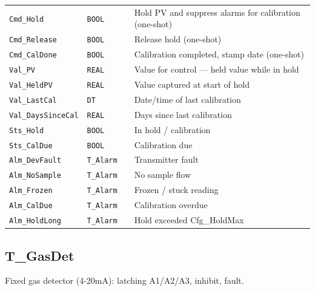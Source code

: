 \begin{small}
\begin{longtable}{@{}P{3.70cm}P{2.20cm}P{1.70cm}P{8.91cm}@{}}
\texttt{Cmd\_Hold} & \texttt{BOOL} &  & Hold PV and suppress alarms for calibration (one-shot) \\
\texttt{Cmd\_Release} & \texttt{BOOL} &  & Release hold (one-shot) \\
\texttt{Cmd\_CalDone} & \texttt{BOOL} &  & Calibration completed, stamp date (one-shot) \\
\texttt{Val\_PV} & \texttt{REAL} &  & Value for control --- held value while in hold \\
\texttt{Val\_HeldPV} & \texttt{REAL} &  & Value captured at start of hold \\
\texttt{Val\_LastCal} & \texttt{DT} &  & Date/\allowbreak{}time of last calibration \\
\texttt{Val\_DaysSinceCal} & \texttt{REAL} &  & Days since last calibration \\
\texttt{Sts\_Hold} & \texttt{BOOL} &  & In hold /\allowbreak{} calibration \\
\texttt{Sts\_CalDue} & \texttt{BOOL} &  & Calibration due \\
\texttt{Alm\_DevFault} & \texttt{T\_Alarm} &  & Transmitter fault \\
\texttt{Alm\_NoSample} & \texttt{T\_Alarm} &  & No sample flow \\
\texttt{Alm\_Frozen} & \texttt{T\_Alarm} &  & Frozen /\allowbreak{} stuck reading \\
\texttt{Alm\_CalDue} & \texttt{T\_Alarm} &  & Calibration overdue \\
\texttt{Alm\_HoldLong} & \texttt{T\_Alarm} &  & Hold exceeded Cfg\_HoldMax \\
\bottomrule
\end{longtable}
\end{small}

\subsection{T\_GasDet}\label{sec:pclib-t-gasdet}

Fixed gas detector (4-20mA): latching A1/\allowbreak{}A2/\allowbreak{}A3, inhibit, fault.

\par{}\par

